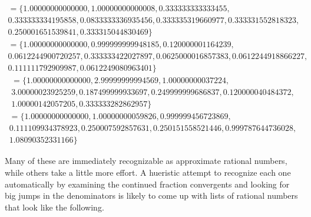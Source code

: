 \begin{multline}
 = \big\{1.00000000000000,
1.00000000000008,
0.333333333333455,
\\0.333333334195858,
0.0833333336935456,
0.333335319660977,
0.333331552818323,
\\0.250001651539841,
0.333315044830469\big\}
\end{multline}
\begin{multline}
 = \big\{1.00000000000000,
0.999999999948185,
0.120000001164239,
\\0.0612244900720257,
0.333333422027897,
0.0625000016857383,
0.0612244918866227,
\\0.111111792909987,
0.0612249080963401\big\}
\end{multline}
\begin{multline}
 = \big\{1.00000000000000,
2.99999999994569,
1.00000000037224,
\\3.00000023925259,
0.187499999933697,
0.249999999686837,
0.120000040484372,
\\1.00000142057205,
0.333333282862957\big\}
\end{multline}
\begin{multline}
 = \big\{1.00000000000000,
1.00000000059826,
0.999999456723869,
\\0.111109934378923,
0.250007592857631,
0.250151558521446,
0.999787644736028,
\\1.08090352331166\big\}
\end{multline}

Many of these are immediately recognizable as approximate rational numbers, while others take a little more effort.
A hueristic attempt to recognize each one automatically by examining the continued fraction convergents
and looking for big jumps in the denominators is likely to come up with lists of rational numbers that
look like the following.


